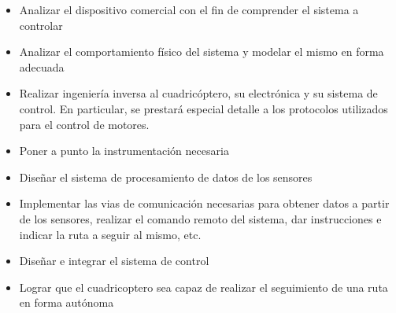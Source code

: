 \documentclass[main]{subfiles}
\begin{document}
\begin{itemize}
\item Analizar el dispositivo comercial con el fin de comprender el sistema a controlar
\item Analizar el comportamiento f\'isico del sistema y modelar el mismo en forma adecuada
\item Realizar ingenier\'ia inversa al cuadric\'optero, su electr\'onica y su sistema de control. En particular, se prestar\'a especial detalle a los protocolos utilizados para el control de motores.
\item Poner a punto la instrumentaci\'on necesaria
\item Dise\~nar el sistema de procesamiento de datos de los sensores
\item Implementar las vias de comunicaci\'on necesarias para obtener datos a partir de los sensores, realizar el comando remoto del sistema, dar instrucciones e indicar la ruta a seguir al mismo, etc.
\item Dise\~nar e integrar el sistema de control
\item Lograr que el cuadricoptero sea capaz de realizar el seguimiento de una ruta en forma aut\'onoma
\end{itemize}
\end{document}
